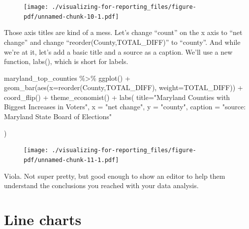 \documentclass[
  letterpaper,
  DIV=11,
  numbers=noendperiod]{scrreprt}
\newenvironment{Shaded}{\begin{snugshade}}{\end{snugshade}}
\newcommand{\AttributeTok}[1]{\textcolor[rgb]{0.40,0.45,0.13}{#1}}
\newcommand{\FunctionTok}[1]{\textcolor[rgb]{0.28,0.35,0.67}{#1}}
\newcommand{\NormalTok}[1]{\textcolor[rgb]{0.00,0.23,0.31}{#1}}
\newcommand{\SpecialCharTok}[1]{\textcolor[rgb]{0.37,0.37,0.37}{#1}}
\newcommand{\StringTok}[1]{\textcolor[rgb]{0.13,0.47,0.30}{#1}}
\begin{document}
\begin{figure}[H]

{\centering \texttt{[image: ./visualizing-for-reporting\_files/figure-pdf/unnamed-chunk-10-1.pdf]}

}

\end{figure}

Those axis titles are kind of a mess. Let's change ``count'' on the x
axis to ``net change'' and change ``reorder(County,TOTAL\_DIFF)'' to
``county''. And while we're at it, let's add a basic title and a source
as a caption. We'll use a new function, labs(), which is short for
labels.

\begin{Shaded}
\begin{Highlighting}[]
\NormalTok{maryland\_top\_counties }\SpecialCharTok{\%\textgreater{}\%}
  \FunctionTok{ggplot}\NormalTok{() }\SpecialCharTok{+}
  \FunctionTok{geom\_bar}\NormalTok{(}\FunctionTok{aes}\NormalTok{(}\AttributeTok{x=}\FunctionTok{reorder}\NormalTok{(County,TOTAL\_DIFF), }\AttributeTok{weight=}\NormalTok{TOTAL\_DIFF)) }\SpecialCharTok{+}
  \FunctionTok{coord\_flip}\NormalTok{() }\SpecialCharTok{+} 
  \FunctionTok{theme\_economist}\NormalTok{() }\SpecialCharTok{+}
  \FunctionTok{labs}\NormalTok{(}
    \AttributeTok{title=}\StringTok{"Maryland Counties with Biggest Increases in Voters"}\NormalTok{,}
    \AttributeTok{x =} \StringTok{"net change"}\NormalTok{,}
    \AttributeTok{y =} \StringTok{"county"}\NormalTok{,}
    \AttributeTok{caption =} \StringTok{"source: Maryland State Board of Elections"}
    
\NormalTok{  )}
\end{Highlighting}
\end{Shaded}

\begin{figure}[H]

{\centering \texttt{[image: ./visualizing-for-reporting\_files/figure-pdf/unnamed-chunk-11-1.pdf]}

}

\end{figure}

Viola. Not super pretty, but good enough to show an editor to help them
understand the conclusions you reached with your data analysis.

\hypertarget{line-charts}{%
\section{Line charts}\label{line-charts}}
\end{document}
